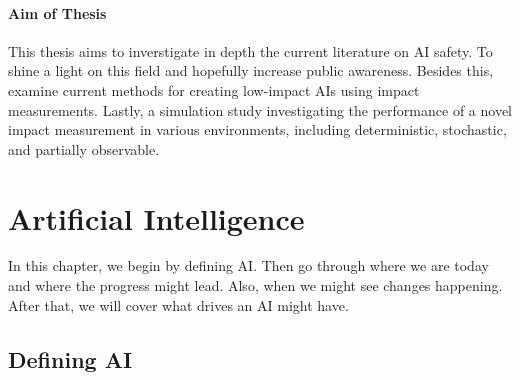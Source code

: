 \documentclass[12pt,A4]{report}
\newcommand{\autobaj}{}
\theoremstyle{definition}
\begin{document}
\subsubsection{Aim of Thesis}
This thesis aims to inverstigate in depth the current literature on AI safety. To shine a light on this field and hopefully increase public awareness. Besides this, examine current methods for creating low-impact AIs using impact measurements. Lastly, a simulation study investigating the performance of a novel impact measurement in various environments, including deterministic, stochastic, and partially observable. 


\chapter{Artificial Intelligence}
In this chapter, we begin by defining AI. Then go through where we are today and where the progress might lead. Also, when we might see changes happening. After that, we will cover what drives an AI might have.

\section{Defining AI}
\end{document}
